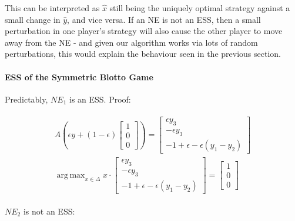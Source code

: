 \documentclass [11pt]{article}
\DeclareMathOperator*{\argmax}{arg\,max}
\begin{document}
This can be interpreted as $\hat{x}$ still being the uniquely optimal strategy against a small change in $\hat{y}$, and vice versa. If an NE is not an ESS, then a small perturbation in one player's strategy will also cause the other player to move away from the NE - and given our algorithm works via lots of random perturbations, this would explain the behaviour seen in the previous section.

\paragraph{ESS of the Symmetric Blotto Game}

Predictably, $NE_1$ is an ESS. Proof:

\begin{align}
  \begin{split}
    A (\epsilon y + (1 - \epsilon)
    \begin{bmatrix}
      1 \\
      0 \\
      0
    \end{bmatrix}
      ) =
    \begin{bmatrix}
      \epsilon y_3 \\
      -\epsilon y_3 \\
      - 1 + \epsilon - \epsilon (y_1 - y_2)
    \end{bmatrix} \\
    \argmax_{x \in \Delta} x \cdot
    \begin{bmatrix}
      \epsilon y_3 \\
      -\epsilon y_3 \\
      - 1 + \epsilon - \epsilon (y_1 - y_2)
    \end{bmatrix}
    =
    \begin{bmatrix}
      1 \\
      0 \\
      0
    \end{bmatrix}
  \end{split}
\end{align}

$NE_2$ is not an ESS:
\end{document}
